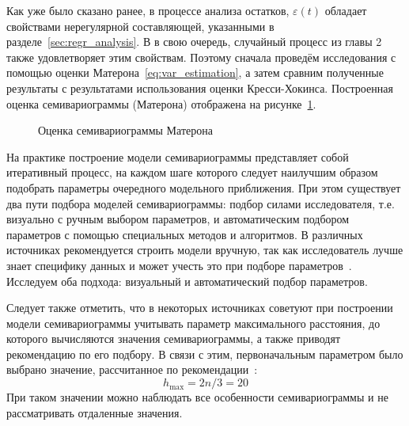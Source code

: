 Как уже было сказано ранее, в процессе анализа остатков, $ \varepsilon(t) $ обладает свойствами нерегулярной составляющей, указанными в разделе~\ref{sec:regr_analysis}. В в свою очередь, случайный процесс из главы 2 также удовлетворяет этим свойствам. Поэтому сначала проведём исследования с помощью оценки Матерона~\eqref{eq:var_estimation}, а затем сравним полученные результаты с результатами использования оценки Кресси-Хокинса. Построенная оценка семивариограммы (Матерона) отображена на рисунке~\ref{img:variogram}.
\begin{figure}[ht]
\caption{Оценка семивариограммы Матерона}
\label{img:variogram}
\end{figure}

На практике построение модели семивариограммы представляет собой итеративный процесс, на каждом шаге которого следует наилучшим образом подобрать параметры очередного модельного приближения. При этом существует два пути подбора моделей семивариограммы: подбор силами исследователя, т.е. визуально с ручным выбором параметров, и автоматическим подбором параметров с помощью специальных методов и алгоритмов. В различных источниках рекомендуется строить модели вручную, так как исследователь лучше знает специфику данных и может учесть это при подборе параметров~\cite{geostat2010}. Исследуем оба подхода: визуальный и автоматический подбор параметров.

Следует также отметить, что в некоторых источниках советуют при построении модели семивариограммы учитывать параметр максимального расстояния, до которого вычисляются значения семивариограммы, а также приводят рекомендацию по его подбору. В связи с этим, первоначальным параметром было выбрано значение, рассчитанное по рекомендации~\cite{cressie2011statistics}:
\begin{equation}
\label{eq:cutoff}
	h_{\text{max}} = 2n / 3 = 20
\end{equation}
При таком значении можно наблюдать все особенности семивариограммы и не рассматривать отдаленные значения.

